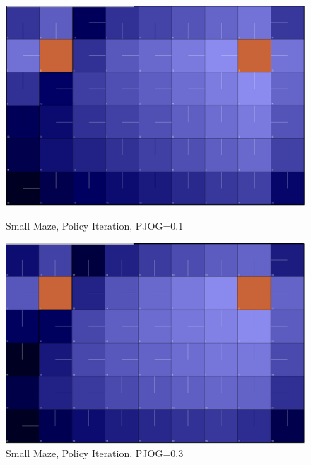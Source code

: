 \documentclass[11pt]{article}
\begin{document}
\begin{figure}[!htb]
   \begin{minipage}{0.4\textwidth}
     \centering
     \includegraphics[width=1.2\linewidth]{../figures/policy1_1.png}
     \caption{Small Maze, Policy Iteration, PJOG=0.1}\label{Fig:policy1_1}
   \end{minipage}\hfill
   \begin{minipage}{0.4\textwidth}
     \centering
     \includegraphics[width=1.2\linewidth]{../figures/policy1_3.png}
     \caption{Small Maze, Policy Iteration, PJOG=0.3}\label{Fig:value1_3}
   \end{minipage}
\end{figure}
\end{document}
